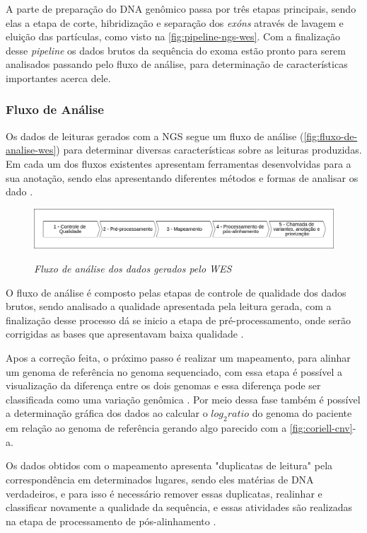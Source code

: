 A parte de preparação do DNA genômico passa por três etapas principais, sendo elas a etapa de corte, hibridização e separação dos \textit{exóns} através de lavagem e eluição das partículas, como visto na \autoref{fig:pipeline-ngs-wes}. Com a finalização desse \textit{pipeline} os dados brutos da sequência do exoma estão pronto para serem analisados passando pelo fluxo de análise, para determinação de características importantes acerca dele.

\subsubsection{Fluxo de Análise}

Os dados de leituras gerados com a NGS segue um fluxo de análise (\autoref{fig:fluxo-de-analise-wes}) para determinar diversas características sobre as leituras produzidas. Em cada um dos fluxos existentes apresentam ferramentas desenvolvidas para a sua anotação, sendo elas apresentando diferentes métodos e formas de analisar os dado \cite{Bao2014}.

\begin{figure}[!htb]
\centering
\caption{\textit{Fluxo de análise dos dados gerados pelo WES}}
\includegraphics[width=1\textwidth]{./dados/figuras/fluxo-de-analise-wes}
\label{fig:fluxo-de-analise-wes}
\end{figure}

O fluxo de análise é composto pelas etapas de controle de qualidade dos dados brutos, sendo analisado a qualidade apresentada pela leitura gerada, com a finalização desse processo dá se inicio a etapa de pré-processamento, onde serão corrigidas as bases que apresentavam baixa qualidade \cite{Bao2014}.

Apos a correção feita, o próximo passo é realizar um mapeamento, para alinhar um genoma de referência no genoma sequenciado, com essa etapa é possível a visualização da diferença entre os dois genomas e essa diferença pode ser classificada como uma variação genômica \cite{Bao2014}. Por meio dessa fase também é possível a determinação gráfica dos dados ao calcular o $log_2 ratio$ do genoma do paciente em relação ao genoma de referência gerando algo parecido com a \autoref{fig:coriell-cnv}-a.

Os dados obtidos com o mapeamento apresenta "duplicatas de leitura" pela correspondência em determinados lugares, sendo eles matérias de DNA verdadeiros, e para isso é necessário remover essas duplicatas, realinhar e classificar novamente a qualidade da sequência, e essas atividades são realizadas na etapa de processamento de pós-alinhamento \cite{Bao2014}.

